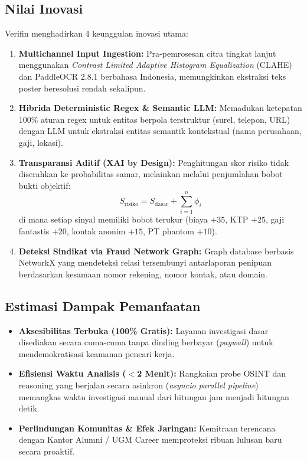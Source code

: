 \documentclass[12pt,a4paper]{article}
\begin{document}
\subsection{Nilai Inovasi}
Verifin menghadirkan 4 keunggulan inovasi utama:
\begin{enumerate}
    \item \textbf{Multichannel Input Ingestion:} Pra-pemrosesan citra tingkat lanjut menggunakan \textit{Contrast Limited Adaptive Histogram Equalization} (CLAHE) dan PaddleOCR 2.8.1 berbahasa Indonesia, memungkinkan ekstraksi teks poster beresolusi rendah sekalipun.
    \item \textbf{Hibrida Deterministic Regex \& Semantic LLM:} Memadukan ketepatan 100\% aturan regex untuk entitas berpola terstruktur (surel, telepon, URL) dengan LLM untuk ekstraksi entitas semantik kontekstual (nama perusahaan, gaji, lokasi).
    \item \textbf{Transparansi Aditif (XAI by Design):} Penghitungan skor risiko tidak diserahkan ke probabilitas samar, melainkan melalui penjumlahan bobot bukti objektif:
    \begin{equation}
        S_{\text{risiko}} = S_{\text{dasar}} + \sum_{i=1}^{n} \phi_i
    \end{equation}
    di mana setiap sinyal memiliki bobot terukur (biaya $+35$, KTP $+25$, gaji fantastis $+20$, kontak anonim $+15$, PT phantom $+10$).
    \item \textbf{Deteksi Sindikat via Fraud Network Graph:} Graph database berbasis NetworkX yang mendeteksi relasi tersembunyi antarlaporan penipuan berdasarkan kesamaan nomor rekening, nomor kontak, atau domain.
\end{enumerate}

\subsection{Estimasi Dampak Pemanfaatan}
\begin{itemize}
    \item \textbf{Aksesibilitas Terbuka (100\% Gratis):} Layanan investigasi dasar disediakan secara cuma-cuma tanpa dinding berbayar (\textit{paywall}) untuk mendemokratisasi keamanan pencari kerja.
    \item \textbf{Efisiensi Waktu Analisis ($<$2 Menit):} Rangkaian probe OSINT dan reasoning yang berjalan secara asinkron (\textit{asyncio parallel pipeline}) memangkas waktu investigasi manual dari hitungan jam menjadi hitungan detik.
    \item \textbf{Perlindungan Komunitas \& Efek Jaringan:} Kemitraan terencana dengan Kantor Alumni / UGM Career memproteksi ribuan lulusan baru secara proaktif.
\end{itemize}
\end{document}
